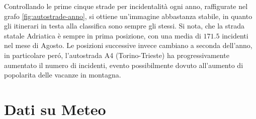 \documentclass[a4paper]{report}
\begin{document}
Controllando le prime cinque strade per incidentalità ogni anno, 
raffigurate nel grafo \ref{fig:autostrade-anno}, si ottiene un'immagine 
abbastanza stabile, in quanto gli itinerari in testa alla classifica sono sempre gli stessi.
Si nota, che la strada statale Adriatica è sempre in prima posizione, 
con una media di $171.5$ incidenti nel mese di Agosto.
Le posizioni successive invece cambiano a seconda dell'anno, in particolare per\'o, l'autostrada 
A4 (Torino-Trieste) ha progressivamente aumentato il numero di incidenti, evento possibilmente 
dovuto all'aumento di popolarita delle vacanze in montagna.


\chapter{Dati su Meteo}



\end{document}

